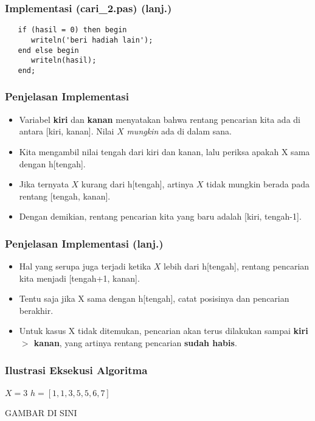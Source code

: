 \documentclass{beamer}
\begin{document}
\begin{frame}[fragile]
\frametitle{Implementasi (cari\_2.pas) (lanj.)}
\begin{lstlisting}
   if (hasil = 0) then begin
      writeln('beri hadiah lain');
   end else begin
      writeln(hasil);
   end;
\end{lstlisting}
\end{frame}

\begin{frame}
\frametitle{Penjelasan Implementasi}
\begin{itemize}
    \item Variabel \textbf{kiri} dan \textbf{kanan} menyatakan bahwa rentang pencarian kita ada di antara [kiri, kanan]. Nilai $X$ \textit{mungkin} ada di dalam sana.
    \item Kita mengambil nilai tengah dari kiri dan kanan, lalu periksa apakah X sama dengan h[tengah].
    \item Jika ternyata $X$ kurang dari h[tengah], artinya $X$ tidak mungkin berada pada rentang [tengah, kanan].
    \item Dengan demikian, rentang pencarian kita yang baru adalah [kiri, tengah-1].
\end{itemize}
\end{frame}

\begin{frame}
\frametitle{Penjelasan Implementasi (lanj.)}
\begin{itemize}
    \item Hal yang serupa juga terjadi ketika $X$ lebih dari h[tengah], rentang pencarian kita menjadi [tengah+1, kanan].
    \item Tentu saja jika X sama dengan h[tengah], catat posisinya dan pencarian berakhir.
    \item Untuk kasus X tidak ditemukan, pencarian akan terus dilakukan sampai \textbf{kiri $>$ kanan}, yang artinya rentang pencarian \textbf{sudah habis}.
\end{itemize}
\end{frame}

\begin{frame}
\frametitle{Ilustrasi Eksekusi Algoritma}
$X=3$ \hfil $h=[1, 1, 3, 5, 5, 6, 7]$

GAMBAR DI SINI
\end{frame}
\end{document}
